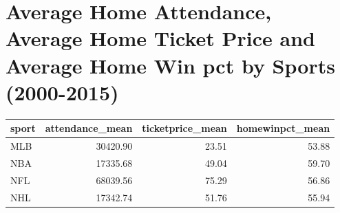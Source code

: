 \documentclass[man, fleqn, noextraspace,floatsintext]{apa6}
\newenvironment{Shaded}{\begin{snugshade}}{\end{snugshade}}
\newcommand{\DataTypeTok}[1]{\textcolor[rgb]{0.13,0.29,0.53}{#1}}
\newcommand{\DecValTok}[1]{\textcolor[rgb]{0.00,0.00,0.81}{#1}}
\newcommand{\KeywordTok}[1]{\textcolor[rgb]{0.13,0.29,0.53}{\textbf{#1}}}
\newcommand{\NormalTok}[1]{#1}
\newcommand{\OperatorTok}[1]{\textcolor[rgb]{0.81,0.36,0.00}{\textbf{#1}}}
\newcommand{\StringTok}[1]{\textcolor[rgb]{0.31,0.60,0.02}{#1}}
\begin{document}
\hypertarget{average-home-attendance-average-home-ticket-price-and-average-home-win-pct-by-sports-2000-2015}{%
\section{Average Home Attendance, Average Home Ticket Price and Average Home Win pct by Sports (2000-2015)}\label{average-home-attendance-average-home-ticket-price-and-average-home-win-pct-by-sports-2000-2015}}

\begin{Shaded}
\end{Shaded}

\begin{tabular}{l|r|r|r}
\hline
sport & attendance\_mean & ticketprice\_mean & homewinpct\_mean\\
\hline
MLB & 30420.90 & 23.51 & 53.88\\
\hline
NBA & 17335.68 & 49.04 & 59.70\\
\hline
NFL & 68039.56 & 75.29 & 56.86\\
\hline
NHL & 17342.74 & 51.76 & 55.94\\
\hline
\end{tabular}
\end{document}
